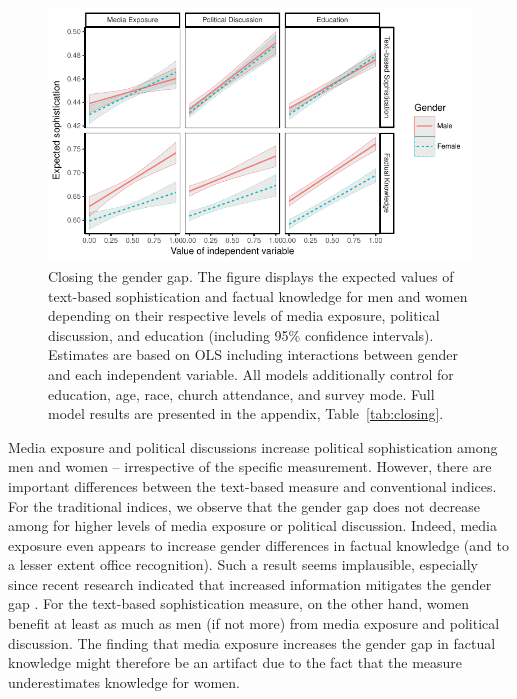 \documentclass[12pt]{article}
\begin{document}
\begin{figure}[h]\centering
\includegraphics{../fig/closing.pdf}
\caption{Closing the gender gap. The figure displays the expected values of text-based sophistication and factual knowledge for men and women depending on their respective levels of media exposure, political discussion, and education (including 95\% confidence intervals). Estimates are based on OLS including interactions between gender and each independent variable. All models additionally control for education, age, race, church attendance, and survey mode. Full model results are presented in the appendix, Table~\ref{tab:closing}.}\label{fig:closing}
\end{figure}

Media exposure and political discussions increase political sophistication among men and women -- irrespective of the specific measurement. However, there are important differences between the text-based measure and conventional indices. For the traditional indices, we observe that the gender gap does not decrease among for higher levels of media exposure or political discussion. Indeed, media exposure even appears to increase gender differences in factual knowledge (and to a lesser extent office recognition). Such a result seems implausible, especially since recent research indicated that increased information mitigates the gender gap \citep{jerit2017revisiting}. For the text-based sophistication measure, on the other hand, women benefit at least as much as men (if not more) from media exposure and political discussion. The finding that media exposure increases the gender gap in factual knowledge might therefore be an artifact due to the fact that the measure underestimates knowledge for women.
\end{document}
